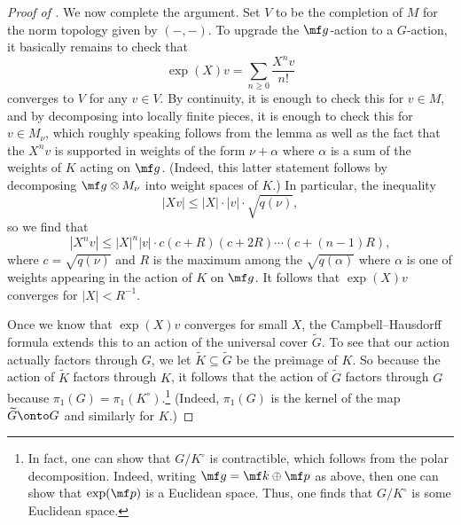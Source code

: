 \documentclass[../notes.tex]{subfiles}
\begin{document}
\begin{proof}[Proof of ]
	We now complete the argument. Set $V$ to be the completion of $M$ for the norm topology given by $(-,-)$. To upgrade the $\mf g$-action to a $G$-action, it basically remains to check that
	\[\exp(X)v=\sum_{n\ge0}\frac{X^nv}{n!}\]
	converges to $V$ for any $v\in V$. By continuity, it is enough to check this for $v\in M$, and by decomposing into locally finite pieces, it is enough to check this for $v\in M_\nu$, which roughly speaking follows from the lemma as well as the fact that the $X^nv$ is supported in weights of the form $\nu+\alpha$ where $\alpha$ is a sum of the weights of $K$ acting on $\mf g$. (Indeed, this latter statement follows by decomposing $\mf g\otimes M_\nu$ into weight spaces of $K$.) In particular, the inequality
	\[\left|Xv\right|\le\left|X\right|\cdot\left|v\right|\cdot\sqrt{q(\nu)},\]
	so we find that
	\[\left|X^nv\right|\le\left|X\right|^n\left|v\right|\cdot c(c+R)(c+2R)\cdots(c+(n-1)R),\]
	where $c=\sqrt{q(\nu)}$ and $R$ is the maximum among the $\sqrt{q(\alpha)}$ where $\alpha$ is one of weights appearing in the action of $K$ on $\mf g$. It follows that $\exp(X)v$ converges for $\left|X\right|<R^{-1}$.

	Once we know that $\exp(X)v$ converges for small $X$, the Campbell--Hausdorff formula extends this to an action of the universal cover $\widetilde G$. To see that our action actually factors through $G$, we let $\widetilde K\subseteq\widetilde G$ be the preimage of $K$. So because the action of $\widetilde K$ factors through $K$, it follows that the action of $\widetilde G$ factors through $G$ because $\pi_1(G)=\pi_1(K^\circ)$.\footnote{In fact, one can show that $G/K^\circ$ is contractible, which follows from the polar decomposition. Indeed, writing $\mf g=\mf k\oplus\mf p$ as above, then one can show that $\exp(\mf p)$ is a Euclidean space. Thus, one finds that $G/K^\circ$ is some Euclidean space.} (Indeed, $\pi_1(G)$ is the kernel of the map $\widetilde G\onto G$ and similarly for $K$.)
\end{proof}
\end{document}
